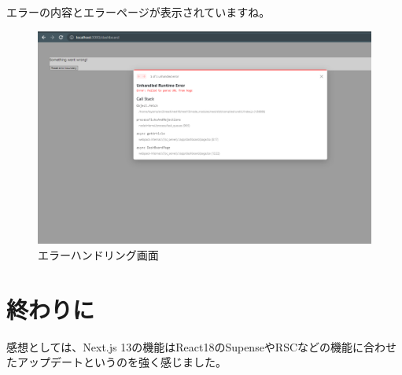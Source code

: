 エラーの内容とエラーページが表示されていますね。


\begin{figure}[H]
  \centering
  \includegraphics[width=12cm]{./image/03-Tech/chap4/08.png}
  \caption{エラーハンドリング画面}
\end{figure}



\section{終わりに}
感想としては、Next.js 13の機能はReact18のSupenseやRSCなどの機能に合わせたアップデートというのを強く感じました。